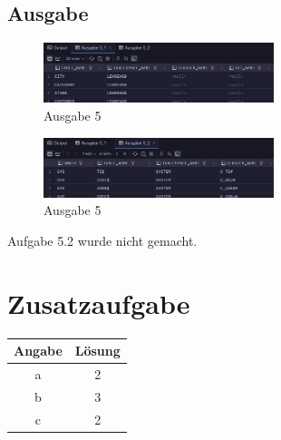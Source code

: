 \documentclass[12pt]{scrartcl}
\begin{document}
\subsection{Ausgabe}

\begin{figure}[H]
	\centering
	\includegraphics[width=0.6\textwidth]{../5_1.png}
	\caption{Ausgabe 5}
\end{figure}

\begin{figure}[H]
	\centering
	\includegraphics[width=0.6\textwidth]{../5_2.png}
	\caption{Ausgabe 5}
\end{figure}

Aufgabe 5.2 wurde nicht gemacht.

\section{Zusatzaufgabe}

\begin{center}
	\begin{tabular}{ c | c }
		Angabe & Lösung \\
		\hline
		a      & 2      \\
		b      & 3      \\
		c      & 2      \\
	\end{tabular}
\end{center}
\end{document}
